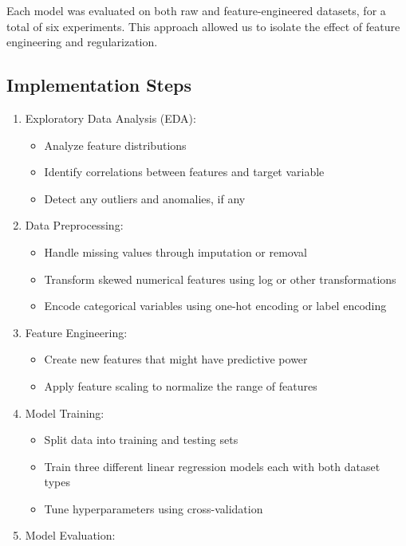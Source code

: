 \documentclass{article}
\begin{document}
Each model was evaluated on both raw and feature-engineered datasets, for a total of six experiments. This approach allowed us to isolate the effect of feature engineering and regularization.

\subsection{Implementation Steps}

\begin{enumerate}
    \item Exploratory Data Analysis (EDA):
    \begin{itemize}
        \item Analyze feature distributions
        \item Identify correlations between features and target variable
        \item Detect any outliers and anomalies, if any
    \end{itemize}
    \item Data Preprocessing:
    \begin{itemize}
        \item Handle missing values through imputation or removal
        \item Transform skewed numerical features using log or other transformations
        \item Encode categorical variables using one-hot encoding or label encoding
    \end{itemize}
    \item Feature Engineering:
    \begin{itemize}
        \item Create new features that might have predictive power
        \item Apply feature scaling to normalize the range of features
    \end{itemize}
    \item Model Training:
    \begin{itemize}
        \item Split data into training and testing sets
        \item Train three different linear regression models each with both dataset types
        \item Tune hyperparameters using cross-validation
    \end{itemize}
    \item Model Evaluation:
    \begin{itemize}

\end{itemize}
\end{enumerate}
\end{document}
